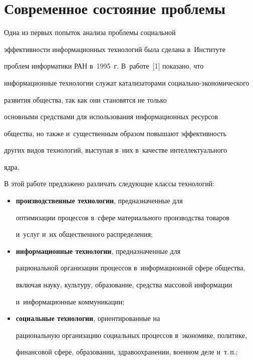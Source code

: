    \section{Современное состояние проблемы}


   


   Одна из первых попыток анализа проб\-ле\-мы социальной 


эф\-фек\-тив\-ности информационных технологий была сделана в~Институте 


проб\-лем информатики РАН в~1995~г. В~работе~[1] показано, что 


информационные технологии служат катализаторами со\-ци\-аль\-но-эко\-но\-ми\-че\-ско\-го 


развития общества, так как они становятся не только 


основными средствами для использования информационных ресурсов 


общества, но так\-же и~существенным образом повышают эф\-фек\-тив\-ность 


других видов технологий, вы\-сту\-пая в~них в~качестве интеллектуального 


\mbox{ядра}.


   


   В этой работе предложено различать следующие классы технологий:


   \begin{itemize}


   \item \textbf{производственные технологии}, предназначенные для 


оптимизации процессов в~сфере материального производства товаров 


и~услуг и~их общественного распределения;


   \item \textbf{информационные технологии}, предназначенные для 


рациональной организации процессов в~информационной сфере общества, 


включая науку, культуру, образование, средства массовой информации 


и~информационные коммуникации; 


   \item \textbf{социальные технологии}, ориентированные на 


рациональную организацию социальных процессов в~экономике, политике, 


финансовой сфере, образовании, здравоохранении, военном деле и~т.\,п.;


   \end{itemize}


